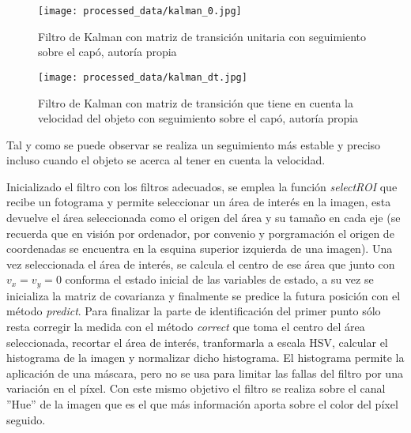 \documentclass[a4paper,12pt]{article}
\begin{document}
{\vspace{0.5cm}

\begin{figure}[h!]
  \centering
  \begin{minipage}[t]{0.45\textwidth}
      \centering
      \texttt{[image: processed\_data/kalman\_0.jpg]}
      \caption{Filtro de Kalman con matriz de transición unitaria con seguimiento sobre el capó, autoría propia}
      \label{fig:kalma-0}
  \end{minipage}
  \hfill
  \begin{minipage}[t]{0.45\textwidth}
      \centering
      \texttt{[image: processed\_data/kalman\_dt.jpg]}
      \caption{Filtro de Kalman con matriz de transición que tiene en cuenta la velocidad del objeto con seguimiento sobre el capó, autoría propia}
      \label{fig:kalma-dt}
  \end{minipage}

\end{figure}

\vspace{0.5cm}

Tal y como se puede observar se realiza un seguimiento más estable y preciso incluso cuando el objeto se acerca al tener en cuenta la velocidad.

\vspace{0.5cm}

Inicializado el filtro con los filtros adecuados, se emplea la función \textit{selectROI} que recibe un fotograma y permite seleccionar un área de interés en la imagen, esta devuelve el área seleccionada como el origen del área 
y su tamaño en cada eje (se recuerda que en visión por ordenador, por convenio y porgramación el origen de coordenadas se encuentra en la esquina superior izquierda de una imagen). Una vez seleccionada el área de interés, se calcula
el centro de ese área que junto con $v_x = v_y = 0$ conforma el estado inicial de las variables de estado, a su vez se inicializa la matriz de covarianza y finalmente se predice la futura posición con el método \textit{predict}.
Para finalizar la parte de identificación del primer punto sólo resta corregir la medida con el método \textit{correct} que toma el centro del área seleccionada, recortar el área de interés, tranformarla a escala HSV, calcular el 
histograma de la imagen y normalizar dicho histograma. El histograma permite la aplicación de una máscara, pero no se usa para limitar las fallas del filtro por una variación en el píxel. Con este mismo objetivo el filtro se 
realiza sobre el canal ''Hue'' de la imagen que es el que más información aporta sobre el color del píxel seguido.

}
\end{document}
